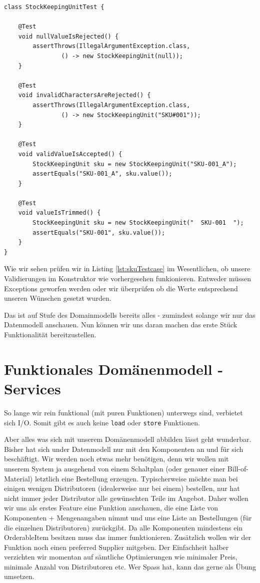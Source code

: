 \begin{listing}[H]
\begin{verbatim}
class StockKeepingUnitTest {

    @Test
    void nullValueIsRejected() {
        assertThrows(IllegalArgumentException.class,
                () -> new StockKeepingUnit(null));
    }

    @Test
    void invalidCharactersAreRejected() {
        assertThrows(IllegalArgumentException.class,
                () -> new StockKeepingUnit("SKU#001"));
    }

    @Test
    void validValueIsAccepted() {
        StockKeepingUnit sku = new StockKeepingUnit("SKU-001_A");
        assertEquals("SKU-001_A", sku.value());
    }

    @Test
    void valueIsTrimmed() {
        StockKeepingUnit sku = new StockKeepingUnit("  SKU-001  ");
        assertEquals("SKU-001", sku.value());
    }
}
\end{verbatim}
\caption{UnitTest für die StockKeepingUnit-Klasse}
\label{lst:skuTestcase}
\end{listing}

Wie wir sehen prüfen wir in Listing \ref{lst:skuTestcase} im Wesentlichen,
ob unsere Validierungen im Konstruktor wie vorhergesehen funkionieren.
Entweder müssen Exceptions geworfen werden oder wir überprüfen ob die
Werte entsprechend unseren Wünschen gesetzt wurden.

Das ist auf Stufe des Domainmodells bereits alles - zumindest solange wir nur
das Datenmodell anschauen. Nun können wir uns daran machen das erste Stück
Funktionalität bereitzustellen.

\section{Funktionales Domänenmodell - Services}
So lange wir rein funktional (mit puren Funktionen) unterwegs sind, verbietet
sich I/O. Somit gibt es auch keine \texttt{load} oder \texttt{store} Funktionen.

Aber alles was sich mit unserem Domänenmodell abbilden lässt geht wunderbar. 
Bisher hat sich under Datenmodell nur mit den Komponenten an und für sich
beschäftigt. Wir werden noch etwas mehr benötigen, denn wir wollen mit unserem
System ja ausgehend von einem Schaltplan (oder genauer einer Bill-of-Material)
letztlich eine Bestellung erzeugen. Typischerweise möchte man bei einigen
wenigen Distributoren (idealerweise nur bei einem) bestellen, nur hat nicht
immer jeder Distributor alle gewünschten Teile im Angebot. Daher wollen
wir uns als erstes Feature eine Funktion anschauen, die eine Liste von 
Komponenten + Mengenangaben nimmt und uns eine Liste
an Bestellungen (für die einzelnen Distributoren) zurückgibt. Da alle 
Komponenten mindestens ein OrderableItem besitzen muss das immer funktionieren.
Zusätzlich wollen wir der Funktion noch einen preferred Supplier mitgeben.
Der Einfachheit halber verzichten wir momentan auf sämtliche Optimierungen
wie minimaler Preis, minimale Anzahl von Distributoren etc. Wer Spass hat,
kann das gerne als Übung umsetzen.

